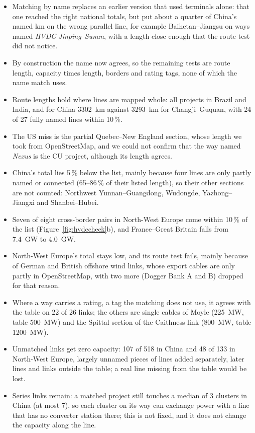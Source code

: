 \begin{itemize}[nosep,leftmargin=*]
  \item Matching by name replaces an earlier version that used terminals alone: that one reached the right national totals, but put about a quarter of China's named km on the wrong parallel line, for example Baihetan--Jiangsu on ways named \emph{HVDC Jinping--Sunan}, with a length close enough that the route test did not notice.
  \item By construction the name now agrees, so the remaining tests are route length, capacity times length, borders and rating tags, none of which the name match uses.
  \item Route lengths hold where lines are mapped whole: all projects in Brazil and India, and for China \SI{3302}{km} against \SI{3293}{km} for Changji--Guquan, with 24 of 27 fully named lines within 10\,\%.
  \item The US miss is the partial Quebec--New England section, whose length we took from OpenStreetMap, and we could not confirm that the way named \emph{Nexus} is the CU project, although its length agrees.
  \item China's total lies 5\,\% below the list, mainly because four lines are only partly named or connected (65--86\,\% of their listed length), so their other sections are not counted: Northwest Yunnan--Guangdong, Wudongde, Yazhong--Jiangxi and Shanbei--Hubei.
  \item Seven of eight cross-border pairs in North-West Europe come within 10\,\% of the list (Figure~\ref{fig:hvdccheck}b), and France--Great Britain falls from \SI{7.4}{GW} to \SI{4.0}{GW}.
  \item North-West Europe's total stays low, and its route test fails, mainly because of German and British offshore wind links, whose export cables are only partly in OpenStreetMap, with two more (Dogger Bank A and B) dropped for that reason.
  \item Where a way carries a rating, a tag the matching does not use, it agrees with the table on 22 of 26 links; the others are single cables of Moyle (\SI{225}{MW}, table \SI{500}{MW}) and the Spittal section of the Caithness link (\SI{800}{MW}, table \SI{1200}{MW}).
  \item Unmatched links get zero capacity: 107 of 518 in China and 48 of 133 in North-West Europe, largely unnamed pieces of lines added separately, later lines and links outside the table; a real line missing from the table would be lost.
  \item Series links remain: a matched project still touches a median of 3 clusters in China (at most 7), so each cluster on its way can exchange power with a line that has no converter station there; this is not fixed, and it does not change the capacity along the line.
\end{itemize}

